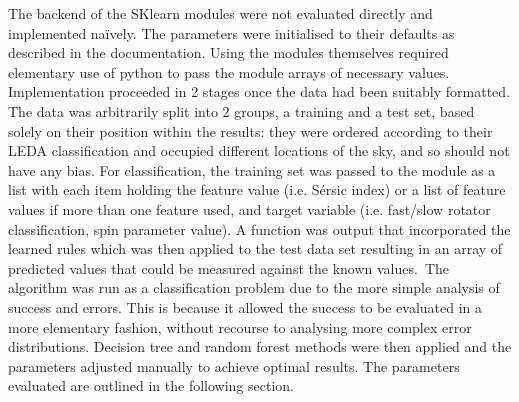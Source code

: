 The backend of the SKlearn modules were not evaluated directly and implemented na\"{i}vely. The parameters were initialised to their defaults as described in the documentation\cite{sklearn}. Using the modules themselves required elementary use of python to pass the module arrays of necessary values. Implementation proceeded in 2 stages once the data had been suitably formatted. The data was arbitrarily split into 2 groups, a training and a test set, based solely on their position within the results: they were ordered according to their LEDA classification and occupied different locations of the sky, and so should not have any bias. For classification, the training set was passed to the module as a list with each item holding the feature value (i.e. S\'{e}rsic index) or a list of feature values if more than one feature used, and target variable (i.e. fast/slow rotator classification, spin parameter value). A function was output that incorporated the learned rules which was then applied to the test data set resulting in an array of predicted values that could be measured against the known values.\
The algorithm was run as a classification problem due to the more simple analysis of success and errors. This is because it allowed the success to be evaluated in a more elementary fashion, without recourse to analysing more complex error distributions.
Decision tree and random forest methods were then applied and the parameters adjusted manually to achieve optimal results. The parameters evaluated are outlined in the following section.
